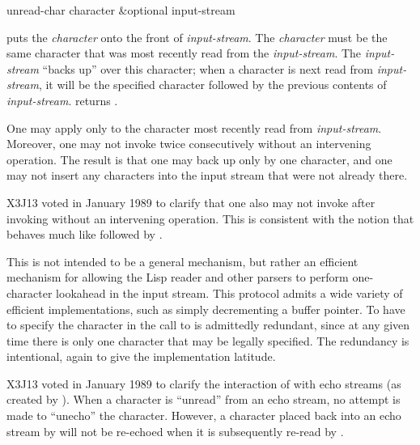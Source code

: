 \begin{defun}[Function]
unread-char character &optional input-stream

 puts the {\it character} onto the front of {\it input-stream}.
The {\it character} must be the same character that was most recently read
from the {\it input-stream}.  The {\it input-stream} ``backs up'' over this
character; when a character is next read from {\it input-stream}, it will
be the specified character followed by the previous contents of
{\it input-stream}.   returns {\false}.

One may apply  only to the character most recently
read from {\it input-stream}.  Moreover, one may not invoke 
twice consecutively without an intervening 
operation.  The result is that one may back up only by one character,
and one may not insert any characters into the input stream that were not already there.

\begin{new}
X3J13 voted in January 1989
to clarify that one also may not invoke
 after invoking  without an intervening
 operation.  This is consistent with the notion that
 behaves much like  followed by .
\end{new}

\beforenoterule
\begin{rationale}
This is not intended to be a general mechanism, but rather
an efficient mechanism for allowing the Lisp reader and other parsers
to perform one-character lookahead in the input stream.
This protocol admits a wide variety of efficient implementations,
such as simply decrementing a buffer pointer.
To have to specify the character in the call to  is
admittedly redundant, since at any given time there is only one character
that may be legally specified.  The redundancy is intentional,
again to give the implementation latitude.
\end{rationale}
\afternoterule

\begin{new}
X3J13 voted in January 1989
to clarify the interaction of  with echo streams
(as created by ).  When a character is ``unread'' from an echo
stream, no attempt is made to ``unecho'' the character.  However, a character
placed back into an echo stream by  will not be re-echoed
when it is subsequently re-read by .
\end{new}
\end{defun}

